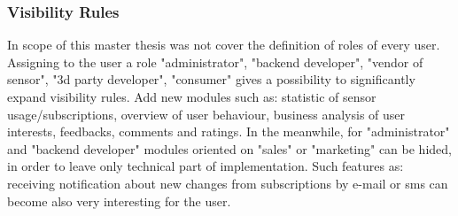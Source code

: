 		\subsubsection {Visibility Rules}
		In scope of this master thesis was not cover the definition of roles of every user. Assigning to the user a role "administrator", "backend developer", "vendor of sensor", "3d party developer", "consumer" gives a possibility to significantly expand visibility rules. Add new modules such as: statistic of sensor usage/subscriptions, overview of user behaviour, business analysis of user interests, feedbacks, comments and ratings. In the meanwhile, for "administrator" and "backend developer" modules oriented on "sales" or "marketing" can be hided, in order to leave only technical part of implementation. Such features as: receiving notification about new changes from subscriptions by e-mail or sms can become also very interesting for the user.
